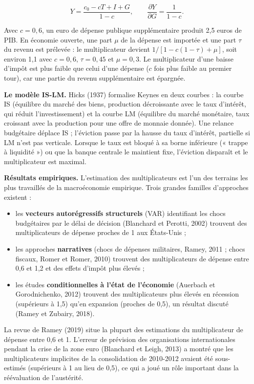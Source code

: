 \documentclass[
  11pt,
  11pt,
  a4paper,
  openany]{book}
\providecommand{\tightlist}{%
  \setlength{\itemsep}{0pt}\setlength{\parskip}{0pt}}
\begin{document}
\[Y = \frac{c_0 - cT + I + G}{1 - c}, \qquad \frac{\partial Y}{\partial G} = \frac{1}{1-c}.\]

Avec \(c = 0{,}6\), un euro de dépense publique supplémentaire produit
2,5 euros de PIB. En économie ouverte, une part \(\mu\) de la dépense
est importée et une part \(\tau\) du revenu est prélevée : le
multiplicateur devient \(1/[1 - c(1-\tau) + \mu]\), soit environ 1,1
avec \(c = 0{,}6\), \(\tau = 0{,}45\) et \(\mu = 0{,}3\). Le
multiplicateur d'une baisse d'impôt est plus faible que celui d'une
dépense (\(c\) fois plus faible au premier tour), car une partie du
revenu supplémentaire est épargnée.

\textbf{Le modèle IS-LM.} Hicks (1937) formalise Keynes en deux courbes
: la courbe IS (équilibre du marché des biens, production décroissante
avec le taux d'intérêt, qui réduit l'investissement) et la courbe LM
(équilibre du marché monétaire, taux croissant avec la production pour
une offre de monnaie donnée). Une relance budgétaire déplace IS ;
l'éviction passe par la hausse du taux d'intérêt, partielle si LM n'est
pas verticale. Lorsque le taux est bloqué à sa borne inférieure («
trappe à liquidité ») ou que la banque centrale le maintient fixe,
l'éviction disparaît et le multiplicateur est maximal.

\textbf{Résultats empiriques.} L'estimation des multiplicateurs est l'un
des terrains les plus travaillés de la macroéconomie empirique. Trois
grandes familles d'approches existent :

\begin{itemize}
\tightlist
\item
  les \textbf{vecteurs autorégressifs structurels} (VAR) identifiant les
  chocs budgétaires par le délai de décision (Blanchard et Perotti,
  2002) trouvent des multiplicateurs de dépense proches de 1 aux
  États-Unis ;
\item
  les approches \textbf{narratives} (chocs de dépenses militaires,
  Ramey, 2011 ; chocs fiscaux, Romer et Romer, 2010) trouvent des
  multiplicateurs de dépense entre 0,6 et 1,2 et des effets d'impôt plus
  élevés ;
\item
  les études \textbf{conditionnelles à l'état de l'économie} (Auerbach
  et Gorodnichenko, 2012) trouvent des multiplicateurs plus élevés en
  récession (supérieurs à 1,5) qu'en expansion (proches de 0,5), un
  résultat discuté (Ramey et Zubairy, 2018).
\end{itemize}

La revue de Ramey (2019) situe la plupart des estimations du
multiplicateur de dépense entre 0,6 et 1. L'erreur de prévision des
organisations internationales pendant la crise de la zone euro
(Blanchard et Leigh, 2013) a montré que les multiplicateurs implicites
de la consolidation de 2010-2012 avaient été sous-estimés (supérieurs à
1 au lieu de 0,5), ce qui a joué un rôle important dans la réévaluation
de l'austérité.
\end{document}
